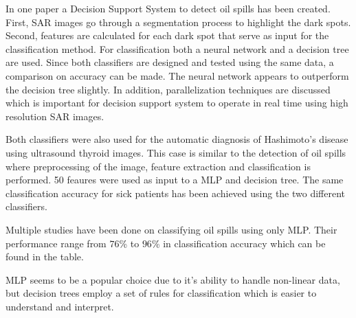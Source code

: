In one paper a Decision Support System to detect oil spills has been created. First, SAR images go through a segmentation process to highlight the dark spots. Second, features are calculated for each dark spot that serve as input for the classification method.  For classification both a neural network and a decision tree are used. Since both classifiers are designed and tested using the same data, a comparison on accuracy can be made. The neural network appears to outperform the decision tree slightly. In addition, parallelization techniques are discussed which is important for decision support system to operate in real time using high resolution SAR images.\cite{Mera201472}
	
	
Both classifiers were also used for the automatic diagnosis of Hashimoto's disease using ultrasound thyroid images\cite{Omiotek201340}. This case is similar to the detection of oil spills where preprocessing of the image, feature extraction and classification is performed. 50 feaures were used as input to a MLP and decision tree. The same classification accuracy for sick patients has been achieved using the two different classifiers.

Multiple studies\cite{Topouzelis200762}\cite{Delfrate200038}\cite{Topouzelis200930}\cite{Topouzelis200924}\cite{Delfrate2004} have been done on classifying oil spills using only MLP. Their performance range from $76$\% to $96$\% in classification accuracy which can be found in the table. 

MLP seems to be a popular choice due to it's ability to handle non-linear data, but decision trees employ a set of rules for classification which is easier to understand and interpret.






	